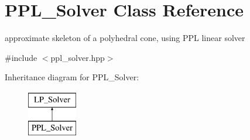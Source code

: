 \hypertarget{class_p_p_l___solver}{}\section{P\+P\+L\+\_\+\+Solver Class Reference}
\label{class_p_p_l___solver}


approximate skeleton of a polyhedral cone, using P\+PL linear solver  




{\ttfamily \#include $<$ppl\+\_\+solver.\+hpp$>$}

Inheritance diagram for P\+P\+L\+\_\+\+Solver\+:\begin{figure}[H]
\begin{center}
\leavevmode
\includegraphics[height=2.000000cm]{class_p_p_l___solver}
\end{center}
\end{figure}
